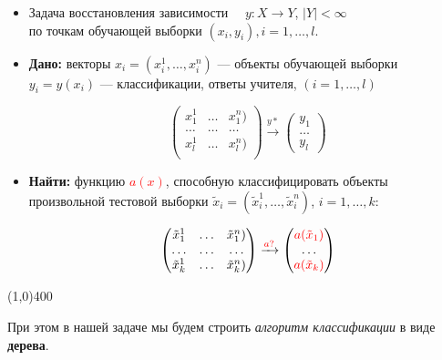 \documentclass{article}
\begin{document}
\begin{itemize}

\item[] Задача восстановления зависимости $\quad y: X\rightarrow Y$, $|Y| < \infty$\\
		по точкам обучающей выборки $(x_i, y_i), i = 1,\ldots, l$.

\item[] \textbf{Дано:} векторы $x_i = (x_i^1, \ldots, x_i^n)$ --- объекты обучающей выборки\\
		$y_i = y(x_i)$ --- классификации, ответы учителя, $(i = 1, \ldots, l)$
		
		$$
		\begin{pmatrix}
			x_1^1 & \ldots & x_1^n)\\
			\ldots & \ldots & \ldots\\
			x_l^1 & \ldots & x_l^n)\\
		\end{pmatrix}
		\xrightarrow{y*}
		\begin{pmatrix}
			y_1\\
			\ldots\\
			y_l
		\end{pmatrix}
		$$
		
\item [] \textbf{Найти:} функцию \textcolor{red}{$a(x)$}, способную классифицировать объекты произвольной тестовой выборки $\tilde{x}_i = (\tilde{x}_i^1, \ldots, \tilde{x}_i^n)$, $i = 1, \ldots, k$:

		$$
		\begin{pmatrix}
			\tilde{x}_1^1 & \ldots & \tilde{x}_1^n)\\
			\ldots & \ldots & \ldots\\
			\tilde{x}_k^1 & \ldots & \tilde{x}_k^n)\\
		\end{pmatrix}
		\xrightarrow{\textcolor{red}{a?}}
		\begin{pmatrix}
			\textcolor{red}{a(\tilde{x}_1)}\\
			\ldots\\
			\textcolor{red}{a(\tilde{x}_k)}
		\end{pmatrix}
		$$
\end{itemize}

\begin{center}
\line(1,0){400}
\end{center}

При этом в нашей задаче мы будем строить \textit{алгоритм классификации} в виде \textbf{дерева}.
\end{document}
